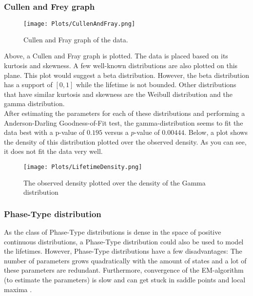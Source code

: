 \subsubsection{Cullen and Frey graph}
\begin{figure}[H]
\centering
\texttt{[image: Plots/CullenAndFray.png]}
\caption{Cullen and Fray graph of the data.}
\end{figure}
Above, a Cullen and Fray graph is plotted. The data is placed based on its kurtosis and skewness. A few well-known distributions are also plotted on this plane. This plot would suggest a beta distribution. However, the beta distribution has a support of $[0,1]$ while the lifetime is not bounded. Other distributions that have similar kurtosis and skewness are the Weibull distribution and the gamma distribution.\\
After estimating the parameters for each of these distributions and performing a Anderson-Darling Goodness-of-Fit test, the gamma-distribution seems to fit the data best with a p-value of $0.195$ versus a $p$-value of $0.00444$. Below, a plot shows the density of this distribution plotted over the observed density. As you can see, it does not fit the data very well.
\begin{figure}[H]
\centering
\texttt{[image: Plots/LifetimeDensity.png]}
\caption{The observed density plotted over the density of the Gamma distribution}
\end{figure}

\subsubsection{Phase-Type distribution}
As the class of Phase-Type distributions is dense in the space of positive continuous distributions, a Phase-Type distribution could also be used to model the lifetimes. However, Phase-Type distributions have a few disadvantages: The number of parameters grows quadratically with the amount of states and a lot of these parameters are redundant. Furthermore, convergence of the EM-algorithm (to estimate the parameters) is slow and can get stuck in saddle points and local maxima \cite{Asmussen1996}.

